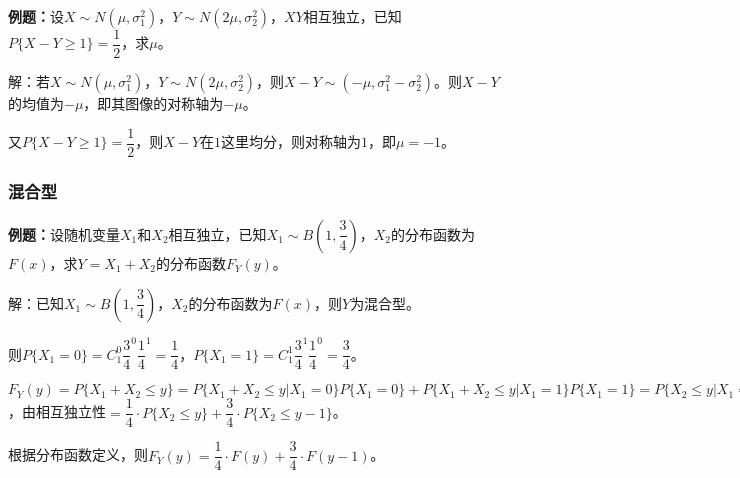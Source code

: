 \documentclass[UTF8, 12pt]{ctexart}
\begin{document}
\textbf{例题：}设$X\sim N(\mu,\sigma_1^2)$，$Y\sim N(2\mu,\sigma_2^2)$，$XY$相互独立，已知$P\{X-Y\geqslant1\}=\dfrac{1}{2}$，求$\mu$。

解：若$X\sim N(\mu,\sigma_1^2)$，$Y\sim N(2\mu,\sigma_2^2)$，则$X-Y\sim(-\mu,\sigma_1^2-\sigma_2^2)$。则$X-Y$的均值为$-\mu$，即其图像的对称轴为$-\mu$。

又$P\{X-Y\geqslant1\}=\dfrac{1}{2}$，则$X-Y$在$1$这里均分，则对称轴为$1$，即$\mu=-1$。

\subsubsection{混合型}

\textbf{例题：}设随机变量$X_1$和$X_2$相互独立，已知$X_1\sim B\left(1,\dfrac{3}{4}\right)$，$X_2$的分布函数为$F(x)$，求$Y=X_1+X_2$的分布函数$F_Y(y)$。

解：已知$X_1\sim B\left(1,\dfrac{3}{4}\right)$，$X_2$的分布函数为$F(x)$，则$Y$为混合型。

则$P\{X_1=0\}=C_1^0\dfrac{3}{4}^0\dfrac{1}{4}^1=\dfrac{1}{4}$，$P\{X_1=1\}=C_1^1\dfrac{3}{4}^1\dfrac{1}{4}^0=\dfrac{3}{4}$。

$F_Y(y)=P\{X_1+X_2\leqslant y\}=P\{X_1+X_2\leqslant y|X_1=0\}P\{X_1=0\}+P\{X_1+X_2\leqslant y|X_1=1\}P\{X_1=1\}=P\{X_2\leqslant y|X_1=0\}P\{X_1=0\}+P\{1+X_2\leqslant y|X_1=1\}P\{X_1=1\}$，由相互独立性$=\dfrac{1}{4}\cdot P\{X_2\leqslant y\}+\dfrac{3}{4}\cdot P\{X_2\leqslant y-1\}$。

根据分布函数定义，则$F_Y(y)=\dfrac{1}{4}\cdot F(y)+\dfrac{3}{4}\cdot F(y-1)$。
\end{document}
